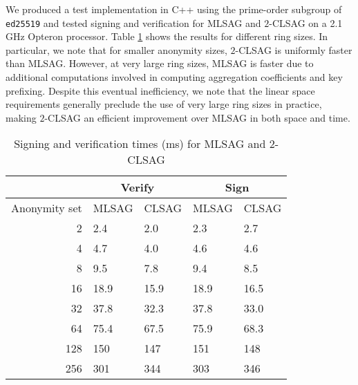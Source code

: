 \documentclass{llncs}
\begin{document}
We produced a test implementation in C++ using the prime-order subgroup of \texttt{ed25519} and tested signing and verification for MLSAG and $2$-CLSAG on a 2.1 GHz Opteron processor. Table \ref{table:timing} shows the results for different ring sizes. In particular, we note that for smaller anonymity sizes, $2$-CLSAG is uniformly faster than MLSAG. However, at very large ring sizes, MLSAG is faster due to additional computations involved in computing aggregation coefficients and key prefixing. Despite this eventual inefficiency, we note that the linear space requirements generally preclude the use of very large ring sizes in practice, making $2$-CLSAG an efficient improvement over MLSAG in both space and time.

\begin{table}[htp]
\begin{center}
\begin{tabular}{r|ll|ll}
& \multicolumn{2}{c|}{Verify} & \multicolumn{2}{c}{Sign} \\
\hline
Anonymity set & MLSAG & CLSAG & MLSAG & CLSAG \\
\hline
2 & 2.4 & 2.0 & 2.3 & 2.7 \\
4 & 4.7 & 4.0 & 4.6 & 4.6 \\
8 & 9.5 & 7.8 & 9.4 & 8.5 \\
16 & 18.9 & 15.9 & 18.9 & 16.5 \\
32 & 37.8 & 32.3 & 37.8 & 33.0 \\
64 & 75.4 & 67.5 & 75.9 & 68.3 \\
128 & 150 & 147 & 151 & 148 \\
256 & 301 & 344 & 303 & 346
\end{tabular}
\end{center}
\caption{Signing and verification times (ms) for MLSAG and $2$-CLSAG}
\label{table:timing}
\end{table}



\end{document}
